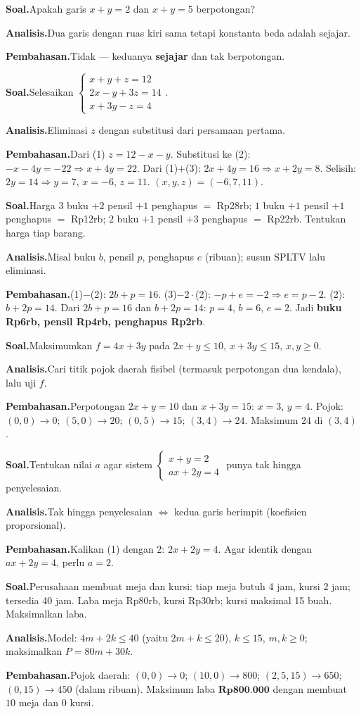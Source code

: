 \documentclass[11pt,a4paper]{report}
\theoremstyle{gaya}
\newcommand{\knomor}[1]{\par\medskip\noindent{\bfseries\color{ungu}#1}\par\nopagebreak}
\newcommand{\ksoal}{\noindent\textbf{\color{biru}Soal.}\space}
\newcommand{\kanalisis}{\par\noindent\textbf{\color{oranye}Analisis.}\space}
\newcommand{\kbahas}{\par\noindent\textbf{\color{hijau}Pembahasan.}\space}
\newcommand{\kbagian}[1]{\par\medskip\noindent{\large\bfseries\color{biru}#1}\par\smallskip}
\begin{document}
\knomor{A.10}
\ksoal Apakah garis $x+y=2$ dan $x+y=5$ berpotongan?
\kanalisis Dua garis dengan ruas kiri sama tetapi konstanta beda adalah sejajar.
\kbahas Tidak --- keduanya \textbf{sejajar} dan tak berpotongan.

\kbagian{Bagian B}

\knomor{B.1}
\ksoal Selesaikan $\begin{cases} x+y+z=12\\ 2x-y+3z=14\\ x+3y-z=4\end{cases}$.
\kanalisis Eliminasi $z$ dengan substitusi dari persamaan pertama.
\kbahas Dari (1) $z=12-x-y$. Substitusi ke (2): $-x-4y=-22\Rightarrow x+4y=22$. Dari (1)$+$(3): $2x+4y=16\Rightarrow x+2y=8$. Selisih: $2y=14\Rightarrow y=7$, $x=-6$, $z=11$. $(x,y,z)=(-6,7,11)$.

\knomor{B.2}
\ksoal Harga $3$ buku $+2$ pensil $+1$ penghapus $=$ Rp28rb; $1$ buku $+1$ pensil $+1$ penghapus $=$ Rp12rb; $2$ buku $+1$ pensil $+3$ penghapus $=$ Rp22rb. Tentukan harga tiap barang.
\kanalisis Misal buku $b$, pensil $p$, penghapus $e$ (ribuan); susun SPLTV lalu eliminasi.
\kbahas (1)$-$(2): $2b+p=16$. (3)$-2\cdot$(2): $-p+e=-2\Rightarrow e=p-2$. (2): $b+2p=14$. Dari $2b+p=16$ dan $b+2p=14$: $p=4$, $b=6$, $e=2$. Jadi \textbf{buku Rp6rb, pensil Rp4rb, penghapus Rp2rb}.

\knomor{B.3}
\ksoal Maksimumkan $f=4x+3y$ pada $2x+y\le10$, $x+3y\le15$, $x,y\ge0$.
\kanalisis Cari titik pojok daerah fisibel (termasuk perpotongan dua kendala), lalu uji $f$.
\kbahas Perpotongan $2x+y=10$ dan $x+3y=15$: $x=3$, $y=4$. Pojok: $(0,0)\to0$; $(5,0)\to20$; $(0,5)\to15$; $(3,4)\to24$. Maksimum $\boxed{24}$ di $(3,4)$.

\knomor{B.4}
\ksoal Tentukan nilai $a$ agar sistem $\begin{cases} x+y=2\\ ax+2y=4\end{cases}$ punya tak hingga penyelesaian.
\kanalisis Tak hingga penyelesaian $\iff$ kedua garis berimpit (koefisien proporsional).
\kbahas Kalikan (1) dengan 2: $2x+2y=4$. Agar identik dengan $ax+2y=4$, perlu $a=2.$

\knomor{B.5}
\ksoal Perusahaan membuat meja dan kursi: tiap meja butuh 4 jam, kursi 2 jam; tersedia 40 jam. Laba meja Rp80rb, kursi Rp30rb; kursi maksimal 15 buah. Maksimalkan laba.
\kanalisis Model: $4m+2k\le40$ (yaitu $2m+k\le20$), $k\le15$, $m,k\ge0$; maksimalkan $P=80m+30k$.
\kbahas Pojok daerah: $(0,0)\to0$; $(10,0)\to800$; $(2{,}5,15)\to650$; $(0,15)\to450$ (dalam ribuan). Maksimum laba $\textbf{Rp800.000}$ dengan membuat $10$ meja dan $0$ kursi.
\end{document}
